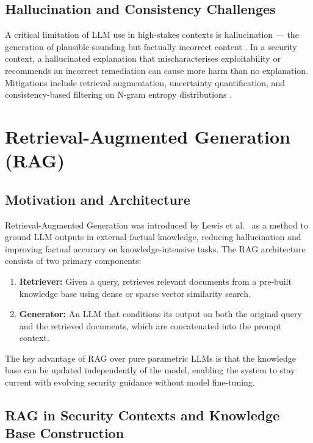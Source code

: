 \subsection{Hallucination and Consistency Challenges}

A critical limitation of LLM use in high-stakes contexts is hallucination --- the generation of plausible-sounding but factually incorrect content \cite{ji2023survey}. In a security context, a hallucinated explanation that mischaracterises exploitability or recommends an incorrect remediation can cause more harm than no explanation. Mitigations include retrieval augmentation, uncertainty quantification, and consistency-based filtering on N-gram entropy distributions \cite{kuhn2023semantic}.

\clearpage
\section{Retrieval-Augmented Generation (RAG)}
\label{sec:rag_background}

\subsection{Motivation and Architecture}

Retrieval-Augmented Generation was introduced by Lewis et al.\ \cite{lewis2020retrieval} as a method to ground LLM outputs in external factual knowledge, reducing hallucination and improving factual accuracy on knowledge-intensive tasks. The RAG architecture consists of two primary components:

\begin{enumerate}
  \item \textbf{Retriever:} Given a query, retrieves relevant documents from a pre-built knowledge base using dense or sparse vector similarity search.
  \item \textbf{Generator:} An LLM that conditions its output on both the original query and the retrieved documents, which are concatenated into the prompt context.
\end{enumerate}

The key advantage of RAG over pure parametric LLMs \cite{brown2020language} is that the knowledge base can be updated independently of the model, enabling the system to stay current with evolving security guidance without model fine-tuning.

\subsection{RAG in Security Contexts and Knowledge Base Construction}

